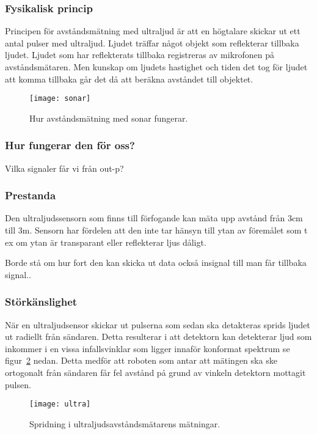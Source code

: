 \documentclass[11pt]{article}
\begin{document}
\begin{flushleft}
 \subsubsection{Fysikalisk princip}
Principen för avståndsmätning med ultraljud är att en högtalare skickar ut ett antal pulser med ultraljud. Ljudet träffar något objekt som reflekterar tillbaka ljudet. Ljudet som har reflekterats tillbaka registreras av mikrofonen på avståndsmätaren. Men kunskap om ljudets hastighet och tiden det tog för ljudet att komma tillbaka går det då att beräkna avståndet till objektet.
\\[0.1in]
\begin{figure}[H]
\centering
\texttt{[image: sonar]}
\caption{Hur avståndsmätning med sonar fungerar. \autocite{sonar}}
\label{fig:sonar}
\end{figure}

\subsubsection{Hur fungerar den för oss?}
Vilka signaler får vi från out-p?
 
\subsubsection{Prestanda}
Den ultraljudssensorn som finns till förfogande kan mäta upp avstånd från 3cm till 3m. Sensorn har fördelen att den inte tar hänsyn till ytan av föremålet som t ex om ytan är transparant eller reflekterar ljus dåligt.  

Borde stå om hur fort den kan skicka ut data också insignal till man får tillbaka signal..
 
 
 \subsubsection{Störkänslighet}
När en ultraljudsensor skickar ut pulserna som sedan ska detakteras sprids ljudet ut radiellt från sändaren. Detta resulterar i att detektorn kan detekterar ljud som inkommer i en vissa infallsvinklar som ligger innaför konformat spektrum se figur~\ref{fig:ultra} nedan. Detta medför att roboten som antar att mätingen ska ske ortogonalt från sändaren får fel avstånd på grund av vinkeln detektorn mottagit pulsen. 

\begin{figure}[H]
\centering
\texttt{[image: ultra]}
\caption{Spridning i ultraljudsavståndsmätarens mätningar. \autocite{spridning} }
\label{fig:ultra}
\end{figure}



\end{flushleft}
\end{document}
